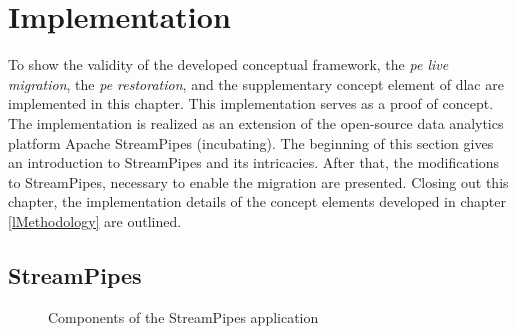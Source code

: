 \section{Implementation}
\label{lImplementation}

To show the validity of the developed conceptual framework, the \textit{\acrshort{pe} live migration}, the \textit{\acrshort{pe} restoration}, and the supplementary concept element of \gls{dlac} are implemented in this chapter. This implementation serves as a proof of concept. The implementation is realized as an extension of the open-source data analytics platform Apache StreamPipes (incubating). The beginning of this section gives an introduction to StreamPipes and its intricacies. After that, the modifications to StreamPipes, necessary to enable the migration are presented. Closing out this chapter, the implementation details of the concept elements developed in chapter \ref{lMethodology} are outlined. 

\subsection{StreamPipes}
\label{lStreamPipes}

\begin{figure}[!b]
    \centering
    \graphicspath{{./figures/code/}}
    
    \caption{Components of the StreamPipes application}
    \label{fStreamPipesSetup}
\end{figure}

